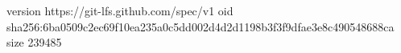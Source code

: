version https://git-lfs.github.com/spec/v1
oid sha256:6ba0509c2ec69f10ea235a0c5dd002d4d2d1198b3f3f9dfae3e8c490548688ca
size 239485
